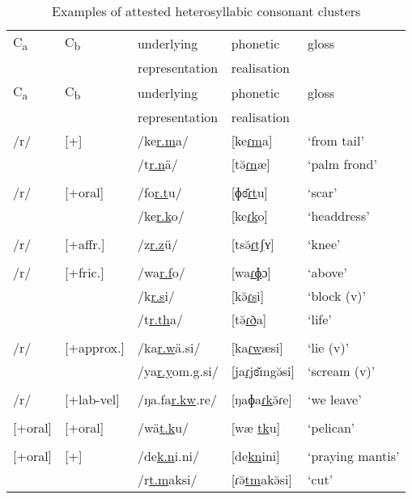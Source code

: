 \clearpage
\begin{table}
\label{heterosyllcctableexamples}
\caption{Examples of attested heterosyllabic consonant clusters}
\begin{tabularx}{\textwidth}{p{}p{}lll}
		\lsptoprule
		C\textsubscript{a} & C\textsubscript{b} & {underlying} & {phonetic} & {gloss}\\
		&&{representation}& {realisation}&\\ \midrule
		C\textsubscript{a} & C\textsubscript{b} & {underlying} & {phonetic} & {gloss}\\
		&&{representation}& {realisation}&\\ \midrule
		/r/ & [+\isi{nasal}] & /ke\uline{r.m}a/&[ke\uline{ɾm}a] &`from tail'\\
		&&/t\uline{r.n}ä/ &[tə̆\uline{ɾn}æ] &`palm frond'\\
		&&&&\\
		/r/ &[+oral] & /fo\uline{r.t}u/&[ɸɞ̆\uline{ɾt}u] &`scar'\\
		&& /ke\uline{r.k}o/&[ke\uline{ɾk}o] &`headdress'\\
		&&&&\\
		/r/ &[+affr.]&/z\uline{r.z}ü/&[tsə̆\uline{ɾtʃ}ʏ] &`knee' \\
		&&&&\\
		/r/ &[+fric.] & /wa\uline{r.f}o/&[wa\uline{ɾɸ}ɔ] &`above'\\
		&&/k\uline{r.s}i/&[kə̆\uline{ɾs}i] &`block (v)'\\
		&&/t\uline{r.th}a/&[tə̆\uline{ɾð}a] &`life'\\
		&&&&\\
		/r/&[+approx.]&/ka\uline{r.w}ä.si/&[ka\uline{ɾw}æsi] &`lie (v)'\\
		&&/ya\uline{r.y}om.g.si/&[ja\uline{ɾj}ɞ̆m\super{ŋ}gə̆si] &`scream (v)'\\
		&&&&\\
		/r/&[+lab-vel]&/ŋa.fa\uline{r.kw}.re/&[ŋaɸa\uline{ɾk\super{w}}ə̆ɾe]&`we leave'\\
		&&&&\\
		{[+oral]}&[+oral]&/wä\uline{t.k}u/&[wæ \uline{tk}u]&`pelican'\\
		&&&&\\
		{[+oral]} &[+\isi{nasal}]&/de\uline{k.n}i.ni/&[\super{n}de\uline{kn}ini]&`praying mantis'\\
		&&/r\uline{t.m}aksi/&[ɾə̆\uline{tm}akə̆si]&`cut'\\

\end{tabularx}
\end{table}
